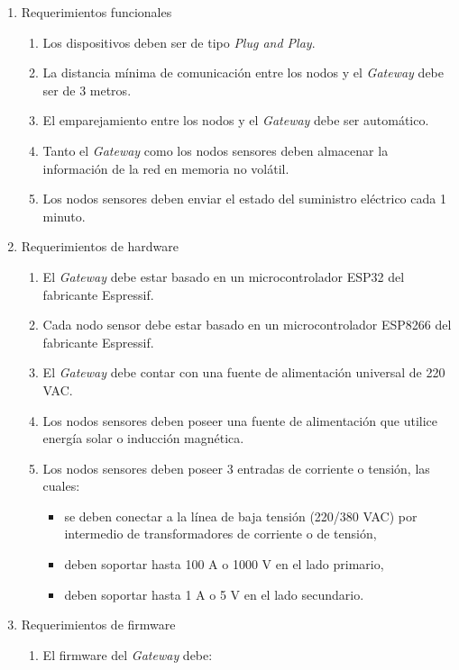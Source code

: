 \documentclass[
11pt, %
]{charter}
\begin{document}
\begin{enumerate}
	\item Requerimientos funcionales
		\begin{enumerate}
			\item Los dispositivos deben ser de tipo \textit{Plug and Play}.
			\item La distancia mínima de comunicación entre los nodos y el \textit{Gateway} debe ser de 3 metros.
			\item El emparejamiento entre los nodos y el \textit{Gateway} debe ser automático.
			\item Tanto el \textit{Gateway} como los nodos sensores deben almacenar la información de la red en memoria no volátil.
			\item Los nodos sensores deben enviar el estado del suministro eléctrico cada 1 minuto.
		\end{enumerate}
	\item Requerimientos de hardware
		\begin{enumerate}
			\item El \textit{Gateway} debe estar basado en un microcontrolador ESP32 del fabricante Espressif.
			\item Cada nodo sensor debe estar basado en un microcontrolador ESP8266 del fabricante Espressif.
			\item El \textit{Gateway} debe contar con una fuente de alimentación universal de 220 VAC.
			\item Los nodos sensores deben poseer una fuente de alimentación que utilice energía solar o inducción magnética.
			\item Los nodos sensores deben poseer 3 entradas de corriente o tensión, las cuales:
				\begin{itemize}
					\item se deben conectar a la línea de baja tensión (220/380 VAC) por intermedio de transformadores de corriente o de tensión,
					\item deben soportar hasta 100 A o 1000 V en el lado primario,
					\item deben soportar hasta 1 A o 5 V en el lado secundario.
				\end{itemize}						
		\end{enumerate}
	\item Requerimientos de firmware
		\begin{enumerate}
			\item El firmware del \textit{Gateway} debe:
				\begin{itemize}

\end{itemize}
\end{enumerate}
\end{enumerate}
\end{document}
